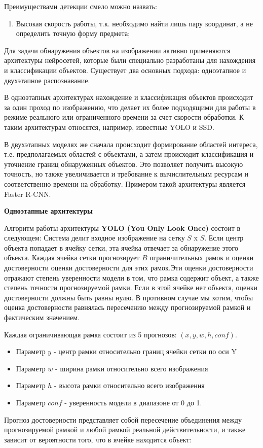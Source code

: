 \documentclass[a4paper,12pt]{article}
\begin{document}
Преимуществами детекции смело можно назвать:
\begin{enumerate}
    \item Высокая скорость работы, т.к. необходимо найти лишь пару координат, а не определить точную форму предмета;
\end{enumerate}

Для задачи обнаружения объектов на изображении активно применяются архитектуры нейросетей, которые были специально разработаны для нахождения и классификации объектов. Существует два основных подхода: одноэтапное и двухэтапное распознавание.

В одноэтапных архитектурах нахождение и классификация объектов происходит за один проход по изображению, что делает их более подходящими для работы в режиме реального или ограниченного времени за счет скорости обработки. К таким архитектурам относятся, например, известные YOLO и SSD.

В двухэтапных моделях же сначала происходит формирование областей интереса, т.е. предполагаемых областей с объектами, а затем происходит классификация и уточнение границ обнаруженных объектов. Это позволяет получить высокую точность, но также увеличивается и требование к вычислительным ресурсам и соответственно времени на обработку. Примером такой архитектуры является Faster R-CNN.

\textbf{Одноэтапные архитектуры}

Алгоритм работы архитектуры \textbf{YOLO (You Only Look Once)} состоит в следующем: Система делит входное изображение на сетку $S$ x $S$. Если центр объекта попадает в ячейку сетки, эта ячейка отвечает за обнаружение этого объекта. Каждая ячейка сетки прогнозирует $B$ ограничительных рамок и оценки достоверности оценки достоверности для этих рамок.Эти оценки достоверности отражают степень уверенности модели в том, что рамка содержит объект, а также степень точности прогнозируемой рамки. Если в этой ячейке нет объекта, оценки достоверности должны быть равны нулю. В противном случае мы хотим, чтобы оценка достоверности равнялась пересечению между прогнозируемой рамкой и фактическим значением.

Каждая ограничивающая рамка состоит из 5 прогнозов: 
$(x, y, w, h, conf)$.
\begin{itemize}
     $x$ - центр рамки относительно границ ячейки сетки по оси X
    \item Параметр $y$ - центр рамки относительно границ ячейки сетки по оси Y
    \item Параметр $w$ - ширина рамки относительно всего изображения
    \item Параметр $h$ - высота рамки относительно всего изображения
    \item Параметр $conf$ - уверенность модели в диапазоне от 0 до 1.
\end{itemize} 
Прогноз достоверности представляет собой пересечение объединения между прогнозируемой рамкой и любой рамкой реальной действительности, и также зависит от вероятности того, что в ячейке находится объект:
\end{document}
